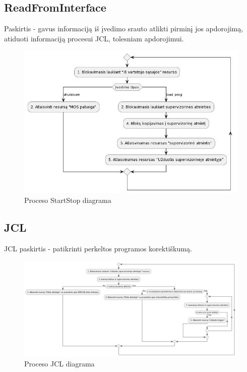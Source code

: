 \documentclass{VUMIFInfKursinis}
\begin{document}
\subsection{ReadFromInterface}

Paskirtis - gavus informaciją iš įvedimo srauto atlikti pirminį jos apdorojimą, atiduoti informaciją procesui JCL, tolesniam apdorojimui.

\begin{figure}[H]
	\centering	
	\includegraphics[scale=0.65]{img/ReadFromInterface}
	\caption{Proceso StartStop diagrama}   %
	\label{img:ReadFromInterface}
\end{figure}

\subsection{JCL}

JCL paskirtis - patikrinti perkeltos programos korektiškumą.

\begin{figure}[H]
	\centering	
	\includegraphics[scale=0.3]{img/JCL}
	\caption{Proceso JCL diagrama}   %
	\label{img:JCL}
\end{figure}
\end{document}
